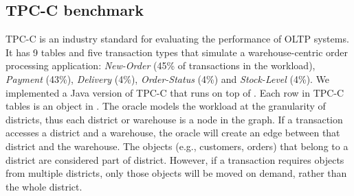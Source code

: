 
\subsection{TPC-C benchmark}
\label{sec:imp:tpcc}


TPC-C is an industry standard for evaluating the performance of OLTP systems.
It has 9 tables and five transaction types that simulate a warehouse-centric 
order processing application: \emph{New-Order} (45\% of transactions in the workload), \emph{Payment} (43\%), \emph{Delivery}
(4\%), \emph{Order-Status} (4\%) and \emph{Stock-Level} (4\%).
We implemented a Java version of TPC-C that runs on top of \dynastar. 
Each row in TPC-C tables is an object in \dynastar. The oracle models the workload at the granularity of districts,
thus each district or warehouse is a node in the graph. If a transaction accesses a district 
and a warehouse, the oracle will create an edge between that district and the warehouse.
The objects (e.g., customers, orders) that belong to a district 
are considered part of district. However, if a transaction requires
objects from multiple districts, only those objects will be moved on demand, rather than
the whole district.


